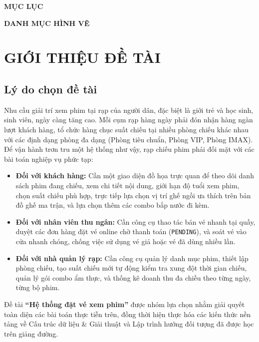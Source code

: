 \documentclass[12pt,a4paper]{article}
\begin{document}
\newpage

\begin{center}
    \textbf{\Large MỤC LỤC}
\end{center}
\vspace{-0.5cm}
\tableofcontents
\thispagestyle{fancy}

\newpage

\begin{center}
    \textbf{\Large DANH MỤC HÌNH VẼ}
\end{center}
\vspace{-0.5cm}
\listoffigures
\thispagestyle{fancy}

\newpage


\section{GIỚI THIỆU ĐỀ TÀI}

\subsection{Lý do chọn đề tài}
Nhu cầu giải trí xem phim tại rạp của người dân, đặc biệt là giới trẻ và học sinh, sinh viên, ngày càng tăng cao. Mỗi cụm rạp hàng ngày phải đón nhận hàng ngàn lượt khách hàng, tổ chức hàng chục suất chiếu tại nhiều phòng chiếu khác nhau với các định dạng phòng đa dạng (Phòng tiêu chuẩn, Phòng VIP, Phòng IMAX). Để vận hành trơn tru một hệ thống như vậy, rạp chiếu phim phải đối mặt với các bài toán nghiệp vụ phức tạp:
\begin{itemize}
    \item \textbf{Đối với khách hàng:} Cần một giao diện đồ họa trực quan để theo dõi danh sách phim đang chiếu, xem chi tiết nội dung, giới hạn độ tuổi xem phim, chọn suất chiếu phù hợp, trực tiếp lựa chọn vị trí ghế ngồi ưa thích trên bản đồ ghế ma trận, và lựa chọn thêm các combo bắp nước đi kèm.
    \item \textbf{Đối với nhân viên thu ngân:} Cần công cụ thao tác bán vé nhanh tại quầy, duyệt các đơn hàng đặt vé online chờ thanh toán (\texttt{PENDING}), và soát vé vào cửa nhanh chóng, chống việc sử dụng vé giả hoặc vé đã dùng nhiều lần.
    \item \textbf{Đối với nhà quản lý rạp:} Cần công cụ quản lý danh mục phim, thiết lập phòng chiếu, tạo suất chiếu mới tự động kiểm tra xung đột thời gian chiếu, quản lý gói combo ẩm thực, và thống kê doanh thu đa chiều theo từng ngày, từng bộ phim.
\end{itemize}
Đề tài \textbf{``Hệ thống đặt vé xem phim''} được nhóm lựa chọn nhằm giải quyết toàn diện các bài toán thực tiễn trên, đồng thời hiện thực hóa các kiến thức nền tảng về Cấu trúc dữ liệu \& Giải thuật và Lập trình hướng đối tượng đã được học trên giảng đường.
\end{document}
